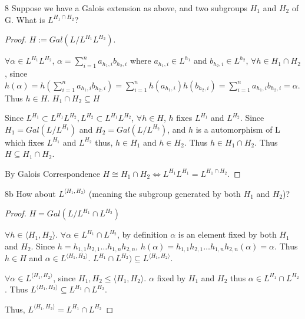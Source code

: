 \documentclass{article}
\newcommand{\angles}[1]{\langle #1 \rangle}
\begin{document}
\begin{PROB}{8}\label{Problem 8.}
    Suppose we have a Galois extension as above, and two subgroups $H_1$ and $H_2$ of G. What is $L^{H_1 \cap H_2}$? 
\end{PROB}
\begin{proof}
    $H := Gal(L / L^{H_1} L^{H_2})$. 

    $\forall \alpha \in L^{H_1}L^{H_2}$, $\alpha = \sum_{i = 1}^{n} a_{h_1, i}b_{h_2, i}$ where $a_{h_1, i} \in L^{h_1}$ and $b_{h_2, i} \in L^{h_2}$, $\forall h \in H_1 \cap H_2$, since $h(\alpha) = h(\sum_{i = 1}^{n} a_{h_1, i}b_{h_2, i}) = \sum_{i = 1}^{n} h(a_{h_1, i})h(b_{h_2, i}) = \sum_{i = 1}^{n} a_{h_1, i}b_{h_2, i} = \alpha$. Thus $h \in H$. $H_1 \cap H_2 \subseteq H$ 

    Since $L^{H_1} \subset L^{H_1}L^{H_2}, L^{H_2} \subset L^{H_1}L^{H_2}$, $\forall h \in H$, $h$ fixes $L^{H_1}$ and $L^{H_2}$. Since $H_1 = Gal(L / L^{H_1})$ and $H_2 = Gal(L / L^{H_2})$, and $h$ is a automorphism of L which fixes $L^{H_1}$ and $L^{H_2}$ thus, $h \in H_1$ and $h \in H_2$. Thus $h \in H_1 \cap H_2$. Thus $ H \subseteq H_1 \cap H_2$.  

    By Galois Correspondence $H \cong H_1 \cap H_2 \iff L^{H_1} L^{H_1} = L^{H_1 \cap H_2}$.
\end{proof}
\begin{PROB}{8b}\label{Problem 8b.}
    How about $L^{\angles{H_1,H_2}}$ (meaning the subgroup generated by both $H_1$ and $H_2$)? 
\end{PROB}
\begin{proof}
    $H = Gal(L / L^{H_1} \cap L^{H_2})$
    
    $\forall h \in \angles{H_1, H_2}$. $\forall \alpha \in L^{H_1} \cap L^{H_2}$, by definition $\alpha$ is an element fixed by both $H_1$ and $H_2$. Since $h = h_{1, 1}h_{2, 1} \dots h_{1, n}h_{2, n}$, $h(\alpha) = h_{1, 1}h_{2, 1} \dots h_{1, n}h_{2, n}(\alpha) = \alpha$. Thus $h \in H$ and $\alpha \in L^{\angles{H_1, H_2}}$. $L^{H_1} \cap L^{H_2}) \subseteq L^{\angles{H_1, H_2}}$.    
    
    $\forall \alpha \in L^{\angles{H_1, H_2}}$, since $H_1, H_2 \leq \angles{H_1, H_2}$. $\alpha$ fixed by $H_1$ and $H_2$ thus $\alpha \in L^{H_1} \cap L^{H_2}$. Thus $L^{\angles{H_1, H_2}} \subseteq L^{H_1} \cap L^{H_2}$.
    
    Thus, $L^{\angles{H_1, H_2}} = L^{H_1} \cap L^{H_2}$ 
\end{proof}

\bigskip
\end{document}
